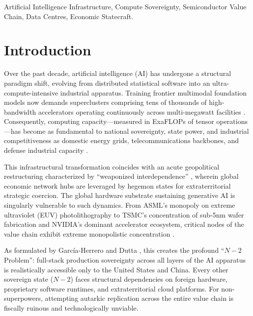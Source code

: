 \documentclass[conference,a4paper]{IEEEtran}
\begin{document}
\begin{IEEEkeywords}
Artificial Intelligence Infrastructure, Compute Sovereignty, Semiconductor Value Chain, Data Centres, Economic Statecraft.
\end{IEEEkeywords}

\section{Introduction}
Over the past decade, artificial intelligence (AI) has undergone a structural paradigm shift, evolving from distributed statistical software into an ultra-compute-intensive industrial apparatus. Training frontier multimodal foundation models now demands superclusters comprising tens of thousands of high-bandwidth accelerators operating continuously across multi-megawatt facilities \cite{geopoliticscompute2026}. Consequently, computing capacity—measured in ExaFLOPs of tensor operations—has become as fundamental to national sovereignty, state power, and industrial competitiveness as domestic energy grids, telecommunications backbones, and defense industrial capacity \cite{sastry2024governance, pau2025sovereignty}.

This infrastructural transformation coincides with an acute geopolitical restructuring characterized by ``weaponized interdependence'' \cite{farrell2019weaponized}, wherein global economic network hubs are leveraged by hegemon states for extraterritorial strategic coercion. The global hardware substrate sustaining generative AI is singularly vulnerable to such dynamics. From ASML's monopoly on extreme ultraviolet (EUV) photolithography to TSMC's concentration of sub-5nm wafer fabrication and NVIDIA's dominant accelerator ecosystem, critical nodes of the value chain exhibit extreme monopolistic concentration \cite{akimitsu2026supply, miller2022chipwar, aimultiple2026chips}.

As formulated by Garc{\'i}a-Herrero and Dutta \cite{portulans2026sovereignty}, this creates the profound ``$N-2$ Problem'': full-stack production sovereignty across all layers of the AI apparatus is realistically accessible only to the United States and China. Every other sovereign state ($N-2$) faces structural dependencies on foreign hardware, proprietary software runtimes, and extraterritorial cloud platforms. For non-superpowers, attempting autarkic replication across the entire value chain is fiscally ruinous and technologically unviable.
\end{document}
